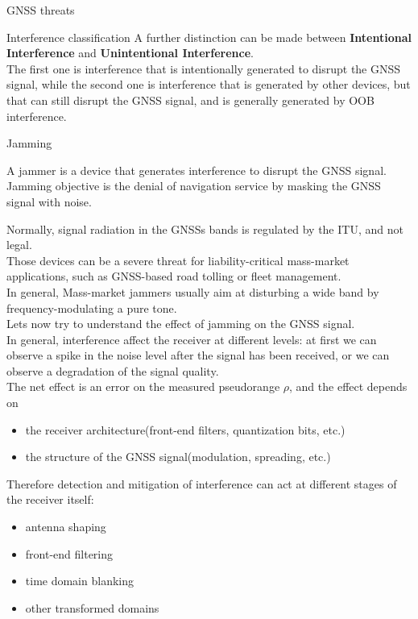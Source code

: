 \begin{section}{GNSS threats}
\begin{subsection}{Interference classification}
        A further distinction can be made between \textbf{Intentional Interference} and
        \textbf{Unintentional Interference}.\\
        The first one is interference that is intentionally generated to disrupt the GNSS signal,
        while the second one is interference that is generated by other devices, but that can still
        disrupt the GNSS signal, and is generally generated by OOB interference.\\
      \end{subsection}

      \begin{subsection}{Jamming}
        \begin{boxH}
          A jammer is a device that generates interference to disrupt the GNSS signal.\\
          Jamming objective is the denial of navigation service by masking the GNSS signal with
          noise.
        \end{boxH}

        Normally, signal radiation in the GNSSs bands is regulated by the ITU, and not legal.\\
        Those devices can be a severe threat for  liability-critical mass-market applications, 
        such as GNSS-based road tolling or fleet management.\\
        In general, Mass-market jammers usually aim at disturbing a wide band by 
        frequency-modulating a pure tone.\\

        Lets now try to understand the effect of jamming on the GNSS signal.\\
        In general, interference affect the receiver at different levels: at first we can observe 
        a spike in the noise level after the signal has been received, or we can observe a
        degradation of the signal quality.\\

        The net effect is an error on the measured pseudorange $\rho$, and the effect depends on
        \begin{itemize}
          \item the receiver architecture(front-end filters, quantization bits, etc.)
          \item the structure of the GNSS signal(modulation, spreading, etc.)
        \end{itemize}

        Therefore detection and mitigation of interference can act at different stages of the 
        receiver itself:
        \begin{itemize}
          \item antenna shaping
          \item front-end filtering
          \item time domain blanking
          \item other transformed domains
        \end{itemize}
        


\end{subsection}
\end{section}
